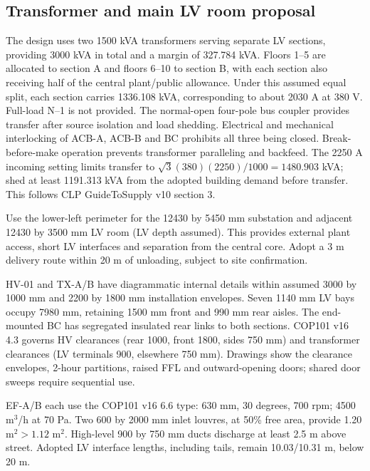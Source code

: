 \subsection*{Transformer and main LV room proposal}
The design uses two 1500 kVA transformers serving separate LV sections, providing 3000 kVA in total and a margin of 327.784 kVA. Floors 1--5 are allocated to section A and floors 6--10 to section B, with each section also receiving half of the central plant/public allowance. Under this assumed equal split, each section carries 1336.108 kVA, corresponding to about 2030 A at 380 V. Full-load N--1 is not provided. The normal-open four-pole bus coupler provides transfer after source isolation and load shedding. Electrical and mechanical interlocking of ACB-A, ACB-B and BC prohibits all three being closed. Break-before-make operation prevents transformer paralleling and backfeed. The 2250 A incoming setting limits transfer to $\sqrt3(380)(2250)/1000=1480.903$ kVA; shed at least 1191.313 kVA from the adopted building demand before transfer. This follows CLP GuideToSupply v10 section 3.

Use the lower-left perimeter for the 12430 by 5450 mm substation and adjacent 12430 by 3500 mm LV room (LV depth assumed). This provides external plant access, short LV interfaces and separation from the central core. Adopt a 3 m delivery route within 20 m of unloading, subject to site confirmation.

HV-01 and TX-A/B have diagrammatic internal details within assumed 3000 by 1000 mm and 2200 by 1800 mm installation envelopes. Seven 1140 mm LV bays occupy 7980 mm, retaining 1500 mm front and 990 mm rear aisles. The end-mounted BC has segregated insulated rear links to both sections. COP101 v16 4.3 governs HV clearances (rear 1000, front 1800, sides 750 mm) and transformer clearances (LV terminals 900, elsewhere 750 mm). Drawings show the clearance envelopes, 2-hour partitions, raised FFL and outward-opening doors; shared door sweeps require sequential use.

EF-A/B each use the COP101 v16 6.6 type: 630 mm, 30 degrees, 700 rpm; 4500 m$^3$/h at 70 Pa. Two 600 by 2000 mm inlet louvres, at 50\% free area, provide 1.20 m$^2>1.12$ m$^2$. High-level 900 by 750 mm ducts discharge at least 2.5 m above street. Adopted LV interface lengths, including tails, remain 10.03/10.31 m, below 20 m.

